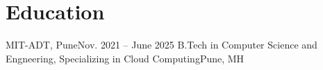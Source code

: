 \section{Education}
  \resumeSubHeadingListStart
    \resumeSubheading
      {MIT-ADT, Pune}{Nov. 2021 -- June 2025}
      {B.Tech in Computer Science and Engneering, Specializing in Cloud Computing}{Pune, MH}
  \resumeSubHeadingListEnd
